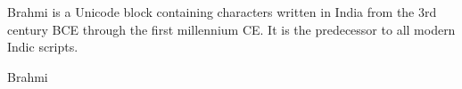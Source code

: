 Brahmi is a Unicode block containing characters written in India from the 3rd century BCE through the first millennium CE. It is the predecessor to all modern Indic scripts.

\begin{scriptexample}[]{Brahmi}
\end{scriptexample}









